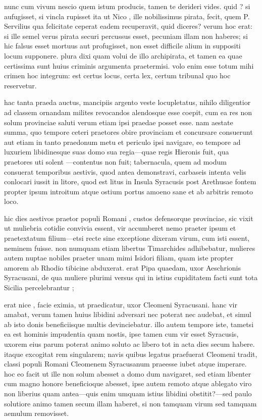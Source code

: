  nunc cum vivum nescio quem istum producis, tamen te derideri vides. quid ? si aufugisset, si vincla rupisset ita ut Nico , ille nobilissimus pirata, fecit, quem P. Servilius qua felicitate ceperat eadem recuperavit, quid diceres? verum hoc erat: si ille semel verus pirata securi percussus esset, pecuniam illam non haberes; si hic falsus esset mortuus aut profugisset, non esset difficile alium in suppositi locum supponere. plura dixi quam volui de illo archipirata, et tamen ea quae certissima sunt huius criminis argumenta praetermisi. volo enim esse totum mihi crimen hoc integrum: est certus locus, certa lex, certum tribunal quo hoc reservetur.

 hac tanta praeda auctus, mancipiis argento veste locupletatus, nihilo diligentior ad classem ornandam milites revocandos alendosque esse coepit, cum ea res non solum provinciae saluti verum etiam ipsi praedae posset esse. nam aestate summa, quo tempore ceteri praetores obire provinciam et concursare consuerunt aut etiam in tanto praedonum metu et periculo ipsi navigare, eo tempore ad luxuriem libidinesque suas domo sua regia—quae regis Hieronis fuit, qua praetores uti solent —contentus non fuit; tabernacula, quem ad modum consuerat temporibus aestivis, quod antea demonstravi, carbaseis intenta velis conlocari iussit in litore, quod est litus in Insula Syracusis post Arethusae fontem propter ipsum introitum atque ostium portus amoeno sane et ab arbitris remoto loco.

 hic dies aestivos praetor populi Romani , custos defensorque provinciae, sic vixit ut muliebria cotidie convivia essent, vir accumberet nemo praeter ipsum et praetextatum filium—etsi recte sine exceptione dixeram virum, cum isti essent, neminem fuisse. non numquam etiam libertus Timarchides adhibebatur, mulieres autem nuptae nobiles praeter unam mimi Isidori filiam, quam iste propter amorem ab Rhodio tibicine abduxerat. erat Pipa quaedam, uxor Aeschrionis Syracusani, de qua muliere plurimi versus qui in istius cupiditatem facti sunt tota Sicilia percelebrantur ;

 erat nice , facie eximia, ut praedicatur, uxor Cleomeni Syracusani. hanc vir amabat, verum tamen huius libidini adversari nec poterat nec audebat, et simul ab isto donis beneficiisque multis devinciebatur. illo autem tempore iste, tametsi ea est hominis impudentia quam nostis, ipse tamen cum vir esset Syracusis, uxorem eius parum poterat animo soluto ac libero tot in acta dies secum habere. itaque excogitat rem singularem; navis quibus legatus praefuerat Cleomeni tradit, classi populi Romani Cleomenem Syracusanum praeesse iubet atque imperare. hoc eo facit ut ille non solum abesset a domo dum navigaret, sed etiam libenter cum magno honore beneficioque abesset, ipse autem remoto atque ablegato viro non liberius quam antea—quis enim umquam istius libidini obstitit?—sed paulo solutiore animo tamen secum illam haberet, si non tamquam virum sed tamquam aemulum removisset.

